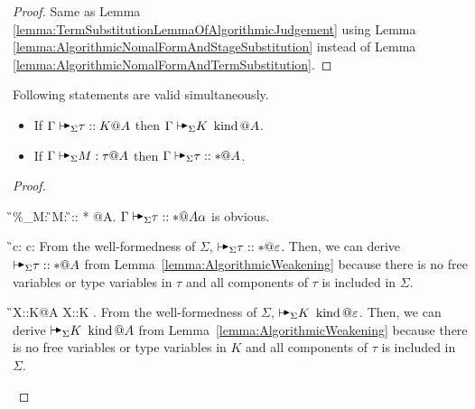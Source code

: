 \begin{proof}
    Same as Lemma \ref{lemma:TermSubstitutionLemmaOfAlgorithmicJudgement} using
    Lemma \ref{lemma:AlgorithmicNomalFormAndStageSubstitution} instead of Lemma
    \ref{lemma:AlgorithmicNomalFormAndTermSubstitution}.
\end{proof}

%

\begin{lemma}
    Following statements are valid simultaneously.
    \label{lemma:AgreementofAlgorithmicTyping}
    \begin{itemize}
        \item If \( \G \AVS \tau :: K @ A \) then \( \G \AVS K \iskind@ A \).
        \item If \( \G \AVS M : \tau @ A \) then \( \G \AVS \tau :: * @ A \).
    \end{itemize}
\end{lemma}

\begin{proof}
    \begin{rneqncase}{\TACsp}{
        \G\AVS \%_\alpha M:
        \G\AVS M:\tau@A {} \G\AVS \tau :: * @A\alpha.
        }
        \( \G\AVS \tau :: * @A\alpha \) is obvious.
    \end{rneqncase}
    \begin{rneqncase}{\TAConst}{
        \G \AVS c:\tau@A
        c:\tau \in \Sigma
        }
        From the well-formedness of \( \Sigma \), \( \AVS \tau :: * @
        \varepsilon \). Then, we can derive \( \AVS \tau :: * @ A \) from
        Lemma~\ref{lemma:AlgorithmicWeakening} because there is no free
        variables or type variables in \( \tau \) and all components of \( \tau
        \) is included in \( \Sigma \).
    \end{rneqncase}
    \begin{rneqncase}{\KATConst}{
            \G \AVS X::K@A
            X::K \in \Sigma.
        }
        From the well-formedness of \( \Sigma \), \( \AVS K \iskind @
        \varepsilon \).  Then, we can derive \( \AVS K \iskind @ A \) from
        Lemma~\ref{lemma:AlgorithmicWeakening} because there is no free
        variables or type variables in \( K \) and all components of \( \tau \)
        is included in \( \Sigma \).
    \end{rneqncase}
\end{proof}

